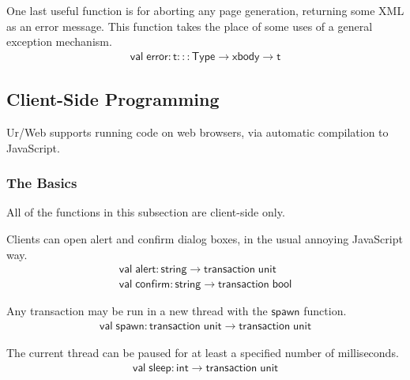 \documentclass{article}
\newcommand{\mt}[1]{\mathsf{#1}}
\begin{document}
One last useful function is for aborting any page generation, returning some XML as an error message.  This function takes the place of some uses of a general exception mechanism.
$$\begin{array}{l}
  \mt{val} \; \mt{error} : \mt{t} ::: \mt{Type} \to \mt{xbody} \to \mt{t}
\end{array}$$


\subsection{Client-Side Programming}

Ur/Web supports running code on web browsers, via automatic compilation to JavaScript.

\subsubsection{The Basics}

All of the functions in this subsection are client-side only.

Clients can open alert and confirm dialog boxes, in the usual annoying JavaScript way.
$$\begin{array}{l}
  \mt{val} \; \mt{alert} : \mt{string} \to \mt{transaction} \; \mt{unit} \\
  \mt{val} \; \mt{confirm} : \mt{string} \to \mt{transaction} \; \mt{bool}
\end{array}$$

Any transaction may be run in a new thread with the $\mt{spawn}$ function.
$$\begin{array}{l}
  \mt{val} \; \mt{spawn} : \mt{transaction} \; \mt{unit} \to \mt{transaction} \; \mt{unit}
\end{array}$$

The current thread can be paused for at least a specified number of milliseconds.
$$\begin{array}{l}
  \mt{val} \; \mt{sleep} : \mt{int} \to \mt{transaction} \; \mt{unit}
\end{array}$$
\end{document}
